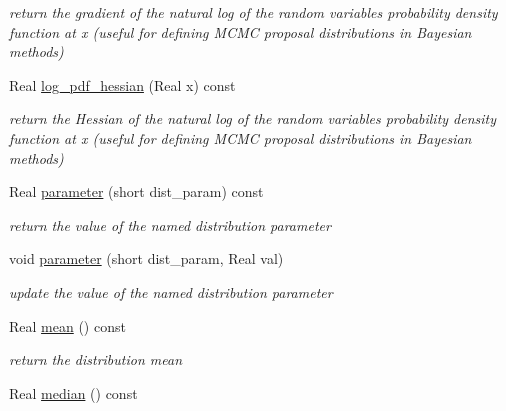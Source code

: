 \begin{DoxyCompactItemize}
\begin{DoxyCompactList}\small\item\em return the gradient of the natural log of the random variable\textquotesingle{}s probability density function at x (useful for defining M\+C\+MC proposal distributions in Bayesian methods) \end{DoxyCompactList}\item 
Real \hyperlink{classPecos_1_1BoundedNormalRandomVariable_a7b43f26f0f2bcdfef15d87e1f9399b33}{log\+\_\+pdf\+\_\+hessian} (Real x) const \label{classPecos_1_1BoundedNormalRandomVariable_a7b43f26f0f2bcdfef15d87e1f9399b33}

\begin{DoxyCompactList}\small\item\em return the Hessian of the natural log of the random variable\textquotesingle{}s probability density function at x (useful for defining M\+C\+MC proposal distributions in Bayesian methods) \end{DoxyCompactList}\item 
Real \hyperlink{classPecos_1_1BoundedNormalRandomVariable_aa891dab1ae9a225f493e3a0e5032b778}{parameter} (short dist\+\_\+param) const \label{classPecos_1_1BoundedNormalRandomVariable_aa891dab1ae9a225f493e3a0e5032b778}

\begin{DoxyCompactList}\small\item\em return the value of the named distribution parameter \end{DoxyCompactList}\item 
void \hyperlink{classPecos_1_1BoundedNormalRandomVariable_ae8e123224f588aee676d5d56d5ca900d}{parameter} (short dist\+\_\+param, Real val)\label{classPecos_1_1BoundedNormalRandomVariable_ae8e123224f588aee676d5d56d5ca900d}

\begin{DoxyCompactList}\small\item\em update the value of the named distribution parameter \end{DoxyCompactList}\item 
Real \hyperlink{classPecos_1_1BoundedNormalRandomVariable_a962ffe5a3593be370d5c883365c060f4}{mean} () const \label{classPecos_1_1BoundedNormalRandomVariable_a962ffe5a3593be370d5c883365c060f4}

\begin{DoxyCompactList}\small\item\em return the distribution mean \end{DoxyCompactList}\item 
Real \hyperlink{classPecos_1_1BoundedNormalRandomVariable_ae1fff19ce29a79d657043a598523635d}{median} () const \label{classPecos_1_1BoundedNormalRandomVariable_ae1fff19ce29a79d657043a598523635d}


\end{DoxyCompactItemize}
